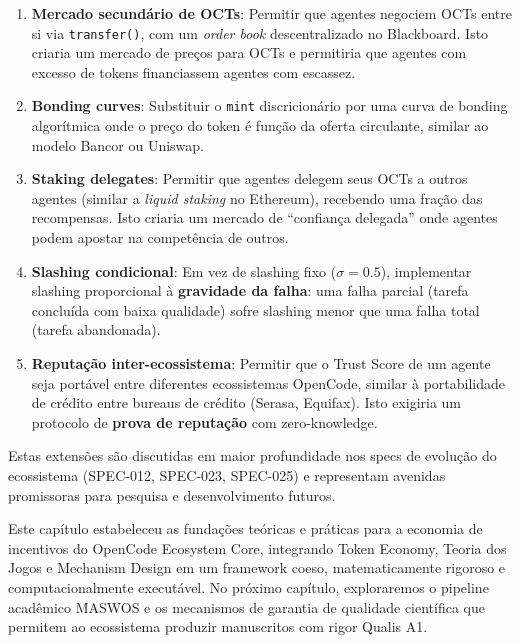 \begin{enumerate}
    \item \textbf{Mercado secundário de OCTs}: Permitir que agentes negociem OCTs entre si via \texttt{transfer()}, com um \textit{order book} descentralizado no Blackboard. Isto criaria um mercado de preços para OCTs e permitiria que agentes com excesso de tokens financiassem agentes com escassez.
    
    \item \textbf{Bonding curves}: Substituir o \texttt{mint} discricionário por uma curva de bonding algorítmica onde o preço do token é função da oferta circulante, similar ao modelo Bancor ou Uniswap.
    
    \item \textbf{Staking delegates}: Permitir que agentes delegem seus OCTs a outros agentes (similar a \textit{liquid staking} no Ethereum), recebendo uma fração das recompensas. Isto criaria um mercado de ``confiança delegada'' onde agentes podem apostar na competência de outros.
    
    \item \textbf{Slashing condicional}: Em vez de slashing fixo ($\sigma = 0.5$), implementar slashing proporcional à \textbf{gravidade da falha}: uma falha parcial (tarefa concluída com baixa qualidade) sofre slashing menor que uma falha total (tarefa abandonada).
    
    \item \textbf{Reputação inter-ecossistema}: Permitir que o Trust Score de um agente seja portável entre diferentes ecossistemas OpenCode, similar à portabilidade de crédito entre bureaus de crédito (Serasa, Equifax). Isto exigiria um protocolo de \textbf{prova de reputação} com zero-knowledge.
\end{enumerate}

Estas extensões são discutidas em maior profundidade nos specs de evolução do ecossistema (SPEC-012, SPEC-023, SPEC-025) e representam avenidas promissoras para pesquisa e desenvolvimento futuros.

Este capítulo estabeleceu as fundações teóricas e práticas para a economia de incentivos do OpenCode Ecosystem Core, integrando Token Economy, Teoria dos Jogos e Mechanism Design em um framework coeso, matematicamente rigoroso e computacionalmente executável. No próximo capítulo, exploraremos o pipeline acadêmico MASWOS e os mecanismos de garantia de qualidade científica que permitem ao ecossistema produzir manuscritos com rigor Qualis A1.

